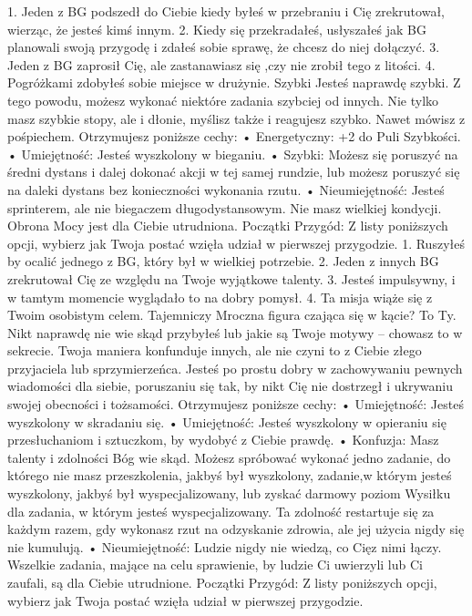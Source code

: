1. Jeden z BG podszedł do Ciebie kiedy byłeś w przebraniu i Cię zrekrutował, wierząc, że jesteś kimś innym.
2. Kiedy się przekradałeś, usłyszałeś jak BG planowali swoją przygodę i zdałeś sobie sprawę, że chcesz do niej dołączyć.
3. Jeden z BG zaprosił Cię, ale zastanawiasz się ,czy nie zrobił tego z litości.
4. Pogróżkami zdobyłeś sobie miejsce w drużynie.
Szybki
Jesteś naprawdę szybki. Z tego powodu, możesz wykonać niektóre zadania szybciej od innych. Nie tylko masz szybkie stopy, ale i dłonie, myślisz także i reagujesz szybko. Nawet mówisz z pośpiechem. 
Otrzymujesz poniższe cechy:
    • Energetyczny: +2 do Puli Szybkości.
    • Umiejętność: Jesteś wyszkolony w bieganiu.
    • Szybki: Możesz się poruszyć na średni dystans i dalej dokonać akcji w tej samej rundzie, lub możesz poruszyć się na daleki dystans bez konieczności wykonania rzutu.
    • Nieumiejętność: Jesteś sprinterem, ale nie biegaczem długodystansowym. Nie masz wielkiej kondycji. Obrona Mocy jest dla Ciebie utrudniona.
Początki Przygód: Z listy poniższych opcji, wybierz jak Twoja postać wzięła udział w pierwszej przygodzie.
1. Ruszyłeś by ocalić jednego z BG, który był w wielkiej potrzebie.
2. Jeden z innych BG zrekrutował Cię ze względu na Twoje wyjątkowe talenty.
3. Jesteś impulsywny, i w tamtym momencie wyglądało to na dobry pomysł.
4. Ta misja wiąże się z Twoim osobistym celem.
Tajemniczy
Mroczna figura czająca się w kącie? To Ty. Nikt naprawdę nie wie skąd przybyłeś lub jakie są Twoje motywy – chowasz to w sekrecie. Twoja maniera konfunduje innych, ale nie czyni to z Ciebie złego przyjaciela lub sprzymierzeńca. Jesteś po prostu dobry w zachowywaniu pewnych wiadomości dla siebie, poruszaniu się tak, by nikt Cię nie dostrzegł i ukrywaniu swojej obecności i tożsamości.
Otrzymujesz poniższe cechy:
    • Umiejętność: Jesteś wyszkolony w skradaniu się.
    • Umiejętność: Jesteś wyszkolony w opieraniu się przesłuchaniom i sztuczkom, by wydobyć z Ciebie prawdę.
    • Konfuzja: Masz talenty i zdolności Bóg wie skąd. Możesz spróbować wykonać jedno zadanie, do którego nie masz przeszkolenia, jakbyś był wyszkolony, zadanie,w którym jesteś wyszkolony, jakbyś był wyspecjalizowany, lub zyskać darmowy poziom Wysiłku dla zadania, w którym jesteś wyspecjalizowany. Ta zdolność restartuje się za każdym razem, gdy wykonasz rzut na odzyskanie zdrowia, ale jej użycia nigdy się nie kumulują.
    • Nieumiejętność: Ludzie nigdy nie wiedzą, co Cięz nimi łączy. Wszelkie zadania, mające na celu sprawienie, by ludzie Ci uwierzyli lub Ci zaufali, są dla Ciebie utrudnione.
Początki Przygód: Z listy poniższych opcji, wybierz jak Twoja postać wzięła udział w pierwszej przygodzie.
